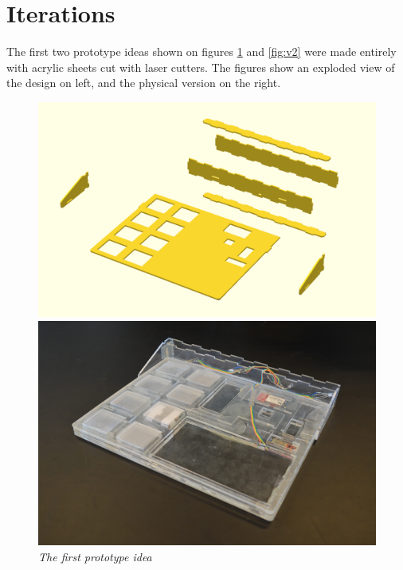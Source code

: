 \section{Iterations}

The first two prototype ideas shown on figures \ref{fig:v1} and \ref{fig:v2} were made entirely with acrylic sheets cut with laser cutters. The figures show an exploded view of the design on left, and the physical version on the right.

\begin{figure}[h]
\begin{minipage}[b]{7.5cm}
\centering
\includegraphics[scale=0.235]{figures/iterations/v1.png}
\end{minipage}
\begin{minipage}[b]{7.5cm}
\centering
\includegraphics[scale=0.58]{figures/iterations/v1-photo.jpg}
\end{minipage}
\caption{\small {\it {The first prototype idea}}} \label{fig:v1}
\end{figure}


